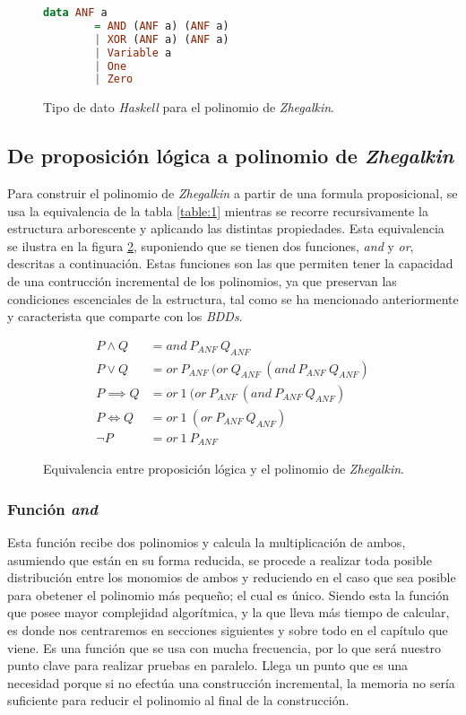 \begin{figure}
\begin{lstlisting}[language=Haskell]
    data ANF a
        = AND (ANF a) (ANF a)
        | XOR (ANF a) (ANF a)
        | Variable a
        | One
        | Zero
\end{lstlisting}
\caption{Tipo de dato \textit{Haskell} para el polinomio de \textit{Zhegalkin}.}
\label{code:anf}
\end{figure}

\subsection{De proposición lógica a polinomio de \textit{Zhegalkin}}
\label{sec:fromProp}

Para construir el polinomio de \textit{Zhegalkin} a partir de una formula proposicional, se usa la equivalencia de la tabla \ref{table:1} mientras se recorre recursivamente la estructura arborescente y aplicando las distintas propiedades. Esta equivalencia se ilustra en la figura \ref{fig:convert}, suponiendo que se tienen dos funciones, \textit{and} y \textit{or}, descritas a continuación. Estas funciones son las que permiten tener la capacidad de una contrucción incremental de los polinomios, ya que preservan las condiciones escenciales de la estructura, tal como se ha mencionado anteriormente y caracterista que comparte con los \textit{BDDs}.

\begin{figure}
\begin{align*}
P \land Q &= and\ P_{ANF}\ Q_{ANF}\\
P \lor Q &= or\ P_{ANF}\ (or\ Q_{ANF}\ (and\ P_{ANF}\ Q_{ANF})\\
P \implies Q &= or\ 1\ (or\ P_{ANF}\ (and\ P_{ANF}\ Q_{ANF})\\
P \iff Q &= or\ 1\ (or\ P_{ANF}\ Q_{ANF}) \\
\neg P &= or\ 1\ P_{ANF}
\end{align*}
\caption{Equivalencia entre proposición lógica y el polinomio de \textit{Zhegalkin}.}
\label{fig:convert}
\end{figure}

\subsubsection{Función \textit{and}}

Esta función recibe dos polinomios y calcula la multiplicación de ambos, asumiendo que están en su forma reducida, se procede a realizar toda posible distribución entre los monomios de ambos y reduciendo en el caso que sea posible para obetener el polinomio más pequeño; el cual es único. Siendo esta la función que posee mayor complejidad algorítmica, y la que lleva más tiempo de calcular, es donde nos centraremos en secciones siguientes y sobre todo en el capítulo que viene. Es una función que se usa con mucha frecuencia, por lo que será nuestro punto clave para realizar pruebas en paralelo. Llega un punto que es una necesidad porque si no efectúa una construcción incremental, la memoria no sería suficiente para reducir el polinomio al final de la construcción.

